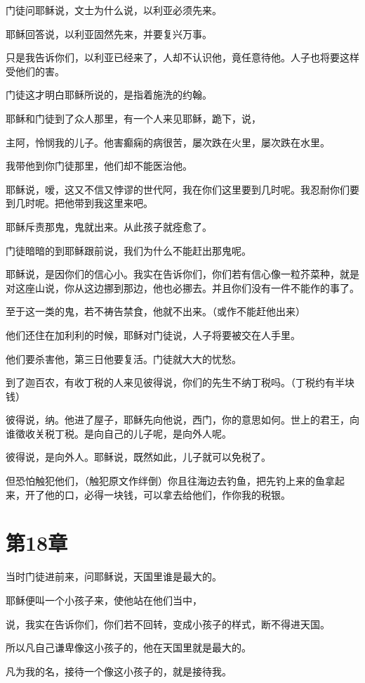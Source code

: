\documentclass[12pt,oneside]{book}
\begin{document}
门徒问耶稣说，文士为什么说，以利亚必须先来。

耶稣回答说，以利亚固然先来，并要复兴万事。

只是我告诉你们，以利亚已经来了，人却不认识他，竟任意待他。人子也将要这样受他们的害。

门徒这才明白耶稣所说的，是指着施洗的约翰。

耶稣和门徒到了众人那里，有一个人来见耶稣，跪下，说，

主阿，怜悯我的儿子。他害癫痫的病很苦，屡次跌在火里，屡次跌在水里。

我带他到你门徒那里，他们却不能医治他。

耶稣说，嗳，这又不信又悖谬的世代阿，我在你们这里要到几时呢。我忍耐你们要到几时呢。把他带到我这里来吧。

耶稣斥责那鬼，鬼就出来。从此孩子就痊愈了。

门徒暗暗的到耶稣跟前说，我们为什么不能赶出那鬼呢。

耶稣说，是因你们的信心小。我实在告诉你们，你们若有信心像一粒芥菜种，就是对这座山说，你从这边挪到那边，他也必挪去。并且你们没有一件不能作的事了。

至于这一类的鬼，若不祷告禁食，他就不出来。（或作不能赶他出来）

他们还住在加利利的时候，耶稣对门徒说，人子将要被交在人手里。

他们要杀害他，第三日他要复活。门徒就大大的忧愁。

到了迦百农，有收丁税的人来见彼得说，你们的先生不纳丁税吗。（丁税约有半块钱）

彼得说，纳。他进了屋子，耶稣先向他说，西门，你的意思如何。世上的君王，向谁徵收关税丁税。是向自己的儿子呢，是向外人呢。

彼得说，是向外人。耶稣说，既然如此，儿子就可以免税了。

但恐怕触犯他们，（触犯原文作绊倒）你且往海边去钓鱼，把先钓上来的鱼拿起来，开了他的口，必得一块钱，可以拿去给他们，作你我的税银。

\chapter{第18章}
当时门徒进前来，问耶稣说，天国里谁是最大的。

耶稣便叫一个小孩子来，使他站在他们当中，

说，我实在告诉你们，你们若不回转，变成小孩子的样式，断不得进天国。

所以凡自己谦卑像这小孩子的，他在天国里就是最大的。

凡为我的名，接待一个像这小孩子的，就是接待我。
\end{document}
